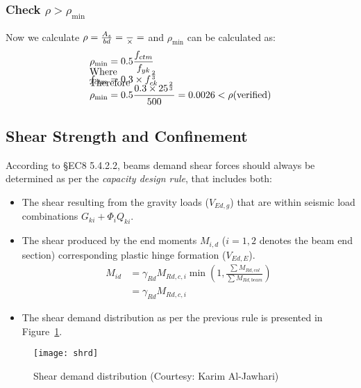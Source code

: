 \subsubsection{Check $\rho > \rho_{\min}$}
Now we calculate $\rho = \frac{A_s}{bd} = \frac{
  \g{As}}{\g{b} \times \g{d}} = \g{rho}$ and $\rho_{\min}$ can
be calculated as:
\begin{align*}
  \rho_{\min} &= 0.5 \frac{f_{ctm}}{f_{yk}} \\
  \\[-1cm]               %
  \intertext{Where}
  \\[-1cm]               %
  f_{ctm} &= 0.3 \times f_{ck}^{\frac{2}{3}} \\
  \\[-1cm]               %
  \intertext{Therefore}
  \\[-1cm]               %
  \rho_{\min} &= 0.5 \frac{0.3 \times 25 ^{\frac{2}{3}}}{500} = 0.0026 < \rho
                \mbox{(verified)}
\end{align*}
\subsection{Shear Strength and Confinement}
According to \S EC8 5.4.2.2, beams demand shear forces should always be
determined as per the \emph{capacity design rule}, that includes both:
\begin{itemize}
\item The shear resulting from the gravity loads ($V_{Ed,g}$) that are within
  seismic load combinations $G_{ki} + \Phi_i Q_{ki}$.
\item The shear produced by the end moments $M_{i,d}$ ($i = 1,2$ denotes the
  beam end section) corresponding plastic hinge formation ($V_{Ed,E}$).
\begin{align*}
  M_{id} &= \gamma_{Rd} M_{Rd,c,i} \min (1,\frac{\sum M_{Rd,col}}{\sum M_{Rd,beam}}) \\
         &= \gamma_{Rd} M_{Rd,c,i} 
\end{align*}
\item The shear demand distribution as per the previous rule is presented in
  Figure~\ref{fig:shrd}.
\end{itemize}

\begin{figure}
  \centering
  \texttt{[image: shrd]}
  \caption{Shear demand distribution (Courtesy: Karim Al-Jawhari)}\label{fig:shrd}
\end{figure}

